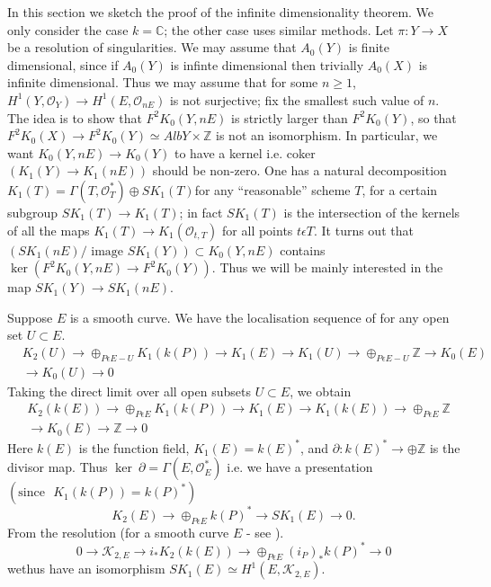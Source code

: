 In this section we sketch the proof of the infinite dimensionality theorem. We only consider the case $k=\mathbb{C}$; the other case uses similar methods. Let $\pi:Y\to X$ be a resolution of singularities. We may assume that $A_0(Y)$ is finite dimensional, since if $A_0(Y)$ is infinte dimensional then trivially $A_0(X)$ is infinite dimensional. Thus we may assume that for some $n\geq 1$, $H^{1}(Y, \mathscr{O}_Y)\to H^{1}(E, \mathscr{O}_{n E})$ is not surjective; fix the smallest such value of $n$. The idea is to show that $F^{2} K_0(Y, n E)$ is strictly larger than $F^{2}K_0(Y)$, so that $F^{2}K_0(X)\to F^{2}K_0(Y)\simeq Alb Y \times \mathbb{Z}$ is not an isomorphism. In particular, we want $K_0(Y, n E)\to K_0(Y)$ to have a kernel i.e. coker $(K_1(Y)\to K_1(n E))$ should be non-zero. One has a natural decomposition $K_1(T)=\Gamma(T, \mathscr{O}_T^{\ast})\oplus SK_1(T)$\pageoriginale for any ``reasonable'' scheme $T$, for a certain subgroup $SK_1(T)\to K_1(T)$; in fact $SK_1(T)$ is the intersection of the kernels of all the maps $K_1(T)\to K_1(\mathscr{O}_{t, T})$ for all points $t \epsilon T$. It turns out that $(SK_1 (nE)/\text{ image } SK_1(Y))\subset K_0(Y, n E)$ contains $\ker \left(F^{2}K_0(Y, n E)\to F^{2}K_0(Y)\right)$. Thus we will be mainly interested in the map $SK_1(Y)\to SK_1(n E)$. 

Suppose $E$ is a smooth curve. We have the localisation sequence of \cite{Quillen} for any open set $U \subset E$. 
$$
\begin{aligned}
&K_2(U)\to \displaystyle\mathop{\oplus}_{P \epsilon E - U}K_1(k(P))\to K_1(E)\to K_1(U)\to \displaystyle\mathop{\oplus}_{P \epsilon E-U}\mathbb{Z}\to K_0(E)\\
&{}\to K_0(U)\to 0
\end{aligned}
$$
Taking the direct limit over all open subsets $U\subset E$, we obtain 
$$
\begin{aligned}
&K_2(k(E))\to \displaystyle\mathop{\oplus}_{P \epsilon E} K_1(k(P))\to K_1(E)\to K_1(k(E))\to \displaystyle\mathop{\oplus}_{P \epsilon E} \mathbb{Z}\\
&{}\to K_0(E)\to \mathbb{Z}\to 0
\end{aligned}
$$
Here $k(E)$ is the function field, $K_1(E)=k(E)^{\ast}$, and $\partial:k(E)^{\ast}\to \oplus \mathbb{Z}$ is the divisor map. Thus $\ker\ \partial =\Gamma(E, \mathscr{O}^{\ast}_E)$ i.e. we have a presentation $(\text{since~ } K_1(k(P))=k(P)^{\ast})$$$
K_2(E)\to \displaystyle\mathop{\oplus}_{P \epsilon E} k(P)^{\ast}\to SK_1(E)\to 0. 
$$
From the resolution (for a smooth curve $E$ - see \cite{Quillen}).
$$
0\to \mathscr{K}_{2, E}\to i_{\ast} K_2(k(E))\to \displaystyle\mathop{\oplus}_{P \epsilon E}(i_P)_{\ast}k(P)^{\ast}\to 0
$$
we\pageoriginale thus have an isomorphism $SK_1(E)\simeq H^{1}(E, \mathscr{K}_{2, E})$. 

